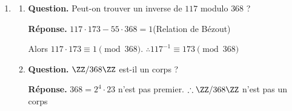 \documentclass[12pt, a4paper]{article}
\begin{document}
\begin{enumerate}[label=2.\arabic*., start=17]
\begin{minipage}[t]{\linewidth}
\begin{enumerate}[\arabic*.]
        On pose $x-5 = d$ et $y-5 = 25/d$, où $d \in \{\pm 1, \pm 5, \pm 25\}$.
        Le cas $d = -5$ donne $(0,0)$, qui est exclu.

        $\therefore (x, y) \in \{(6,30), (10,10), (30,6), (4,-20), (-20,4)\}$

  \item \textbf{Question.} $x^2-y^2-4x-2y-5=0$.
\par\smallskip
\textbf{Réponse.} $x^2 - y^2 - 4x - 2y - 5 = 0 \iff (x-2)^2 - (y+1)^2 = 8$
        \[
          \iff (x-y-3)(x+y-1) = 8
        \]
        On pose $x-y-3 = d$ et $x+y-1 = 8/d$, où $d \mid 8$. Alors
        \[
          x = 2 + \frac{d + 8/d}{2}, \qquad y = -1 + \frac{8/d - d}{2}
        \]
        Pour que $x, y \in \ZZ$, $d$ et $8/d$ doivent avoir la même parité, donc $d \in \{\pm 2, \pm 4\}$.

        $\therefore (x, y) \in \{(5,0), (5,-2), (-1,0), (-1,-2)\}$

\end{enumerate}
\end{minipage}

  \item \begin{minipage}[t]{\linewidth}\raggedright
\begin{enumerate}[\arabic*.]
        \item \textbf{Question.} Peut-on trouver un inverse de $117$ modulo $368$ ?
\par\smallskip
\textbf{Réponse.} $117 \cdot 173 - 55 \cdot 368 = 1$\hfill(Relation de Bézout)

        Alors $117 \cdot 173 \equiv 1 \pmod{368}$.
        $\therefore 117^{-1} \equiv 173 \pmod{368}$

  \item \textbf{Question.} $\ZZ/368\ZZ$ est-il un corps ?
\par\smallskip
\textbf{Réponse.} $368 = 2^4 \cdot 23$ n'est pas premier.
        $\therefore \ZZ/368\ZZ$ n'est pas un corps

\end{enumerate}
\end{minipage}


\end{enumerate}
\end{document}
